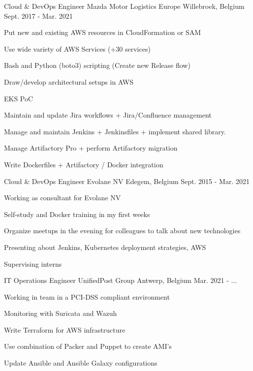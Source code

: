 \begin{cventries}
  \cventry
    {Cloud \& DevOps Engineer} %
    {Mazda Motor Logistics Europe} %
    {Willebroek, Belgium} %
    {Sept. 2017 - Mar. 2021} %
    {
      \begin{cvitems} %
        \item {Put new and existing AWS resources in CloudFormation or SAM}
        \item {Use wide variety of AWS Services (+30 services)}
        \item {Bash and Python (boto3) scripting (Create new Release flow)}
        \item {Draw/develop architectural setups in AWS}
        \item {EKS PoC}
        \item {Maintain and update Jira workflows + Jira/Confluence management}
        \item {Manage and maintain Jenkins + Jenkinsfiles + implement shared library.}
        \item {Manage Artifactory Pro + perform Artifactory migration}
        \item {Write Dockerfiles + Artifactory / Docker integration}
      \end{cvitems}
    }

  \cventry
    {Cloud \& DevOps Engineer} %
    {Evolane NV} %
    {Edegem, Belgium} %
    {Sept. 2015 - Mar. 2021} %
    {
      \begin{cvitems} %
        \item {Working as consultant for Evolane NV}
        \item {Self-study and Docker training in my first weeks}
        \item {Organize meetups in the evening for colleagues to talk about new technologies}
        \item {Presenting about Jenkins, Kubernetes deployment strategies, AWS}
        \item {Supervising interns}
      \end{cvitems}
    }

  \cventry
    {IT Operations Engineer} %
    {UnifiedPost Group} %
    {Antwerp, Belgium} %
    {Mar. 2021 - ...} %
    {
      \begin{cvitems} %
        \item {Working in team in a PCI-DSS compliant environment}
        \item {Monitoring with Suricata and Wazuh}
        \item {Write Terraform for AWS infrastructure}
        \item {Use combination of Packer and Puppet to create AMI's}
        \item {Update Ansible and Ansible Galaxy configurations}
      \end{cvitems}
    }

\end{cventries}
